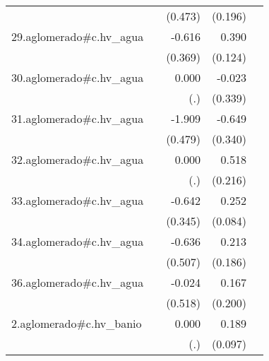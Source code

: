 {\begin{longtable}{l*{4}{D{.}{.}{-1}}}
            &                     &     (0.473)         &     (0.196)         &                     \\
\addlinespace
29.aglomerado#c.hv\_agua&                     &      -0.616         &       0.390\sym{**} &                     \\
            &                     &     (0.369)         &     (0.124)         &                     \\
\addlinespace
30.aglomerado#c.hv\_agua&                     &       0.000         &      -0.023         &                     \\
            &                     &         (.)         &     (0.339)         &                     \\
\addlinespace
31.aglomerado#c.hv\_agua&                     &      -1.909\sym{***}&      -0.649         &                     \\
            &                     &     (0.479)         &     (0.340)         &                     \\
\addlinespace
32.aglomerado#c.hv\_agua&                     &       0.000         &       0.518\sym{*}  &                     \\
            &                     &         (.)         &     (0.216)         &                     \\
\addlinespace
33.aglomerado#c.hv\_agua&                     &      -0.642         &       0.252\sym{**} &                     \\
            &                     &     (0.345)         &     (0.084)         &                     \\
\addlinespace
34.aglomerado#c.hv\_agua&                     &      -0.636         &       0.213         &                     \\
            &                     &     (0.507)         &     (0.186)         &                     \\
\addlinespace
36.aglomerado#c.hv\_agua&                     &      -0.024         &       0.167         &                     \\
            &                     &     (0.518)         &     (0.200)         &                     \\
\addlinespace
2.aglomerado#c.hv\_banio&                     &       0.000         &       0.189         &                     \\
            &                     &         (.)         &     (0.097)         &                     \\

\end{longtable}}

